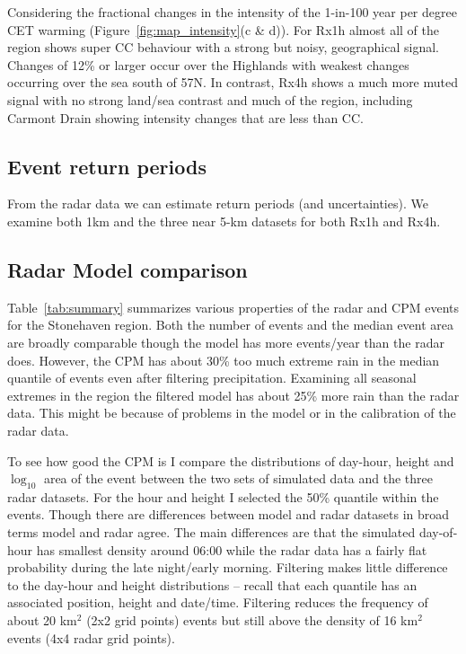 \documentclass[11pt,a4paper]{article}
\begin{document}
Considering the fractional changes in the intensity of the 1-in-100 year per degree CET warming (Figure~\ref{fig:map_intensity}(c \& d)). For Rx1h almost all of the region shows super CC behaviour with a strong but noisy,  geographical signal.  Changes of 12\% or larger occur over the Highlands with weakest changes occurring over the sea south of 57N. In contrast, Rx4h shows a much more muted signal with no strong land/sea contrast and much of the region, including Carmont Drain showing intensity changes that are less than CC. 

\subsection{Event return periods}
From the radar data we can estimate return periods (and uncertainties). We examine both 1km and the three near 5-km datasets for both Rx1h and Rx4h. 
\subsection{Radar Model comparison}

Table~\ref{tab:summary} summarizes various properties of the radar and CPM events for the Stonehaven region.  Both the number of events and the median event area are broadly comparable though the model has more events/year than the radar does.  However, the CPM has about 30\% too much extreme rain in the median quantile of events even after filtering precipitation. Examining  all seasonal extremes in the region the filtered model has about 25\% more rain than the radar data.  This might be because of problems in the model or in the calibration of the radar data. 

To see how good the CPM is I compare the distributions of  day-hour, height and  $\log_{10}$ area of the event between the two sets of simulated data and the three radar datasets. For the hour and height I selected the 50\% quantile within the events. Though there are differences between model and radar datasets in broad terms model and radar agree. The main differences are that the simulated day-of-hour has smallest density around 06:00 while the radar data has a fairly flat probability during the late night/early morning. Filtering makes little difference to the day-hour and height distributions -- recall that each quantile has an associated position, height and date/time. Filtering reduces the frequency of about 20 km$^2$ (2x2 grid points) events but still above the density of 16 km$^2$ events (4x4 radar grid points). 
\end{document}
